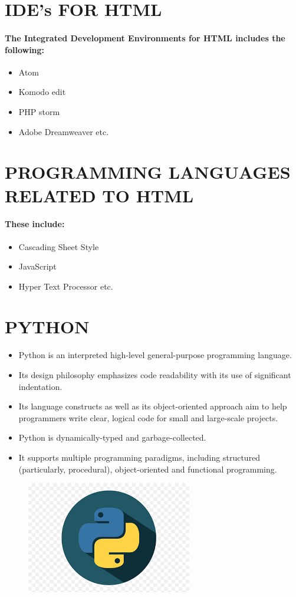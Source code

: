 \documentclass{article}
\begin{document}
	\section*{IDE’s FOR HTML}
	\paragraph{The Integrated Development Environments for HTML includes the following:}
	\begin{itemize}
		\item Atom
		\item Komodo edit
		\item PHP storm
		\item Adobe Dreamweaver etc.
		
	\end{itemize}
	\newpage
	\section*{PROGRAMMING LANGUAGES RELATED TO HTML}
	\paragraph{These include:
	}
	\begin{itemize}
		\item Cascading Sheet Style
		\item JavaScript
		\item Hyper Text Processor etc.
	\end{itemize}

\newpage
\pagecolor{white}
\color{black}
\section*{PYTHON}
\begin{itemize}
	\item Python is an interpreted high-level general-purpose programming language. 
	\item Its design philosophy emphasizes code readability with its use of significant indentation. 
	\item Its language constructs as well as its object-oriented approach aim to help programmers write clear, logical code for small and large-scale projects.
	\item Python is dynamically-typed and garbage-collected.
	\item It supports multiple programming paradigms, including structured (particularly, procedural), object-oriented and functional programming.
\end{itemize}
\begin{figure}
		\begin{center}
	\includegraphics[width=0.3\linewidth]{python.png}
\end{center}
\end{figure}
\newpage
\end{document}
